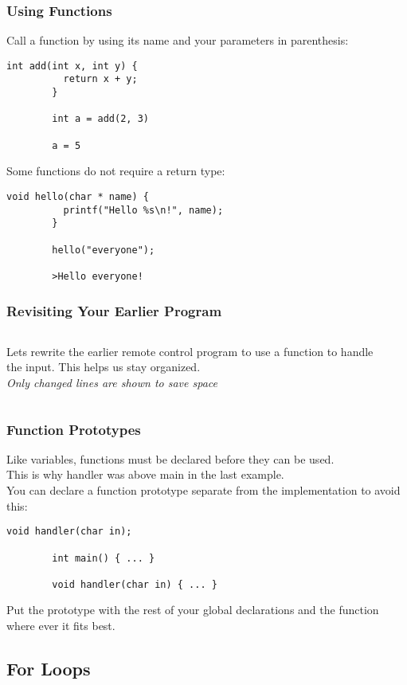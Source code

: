 \begin{frame}[fragile]
	\frametitle{Using Functions}
	Call a function by using its name and your parameters in parenthesis:
	\begin{lstlisting}[numbers=none]
		int add(int x, int y) {
		  return x + y;
		}
		
		int a = add(2, 3)
		
		a = 5
	\end{lstlisting}
	Some functions do not require a return type:
	\begin{lstlisting}[numbers=none]
		void hello(char * name) {
		  printf("Hello %s\n!", name);
		}
		
		hello("everyone");
		
		>Hello everyone!
	\end{lstlisting}
\end{frame}

\begin{frame}[fragile]
	\frametitle{Revisiting Your Earlier Program}
	\begin{columns}[T]
		\begin{column}{0.5\textwidth}
			Lets rewrite the earlier remote control program to use a function to handle the input.
			This helps us stay organized.\\
			\pause
			\vspace{2ex}
			\textit{Only changed lines are shown to save space}
		\end{column}
		\begin{column}{0.5\textwidth}
	
		\end{column}
	\end{columns}
\end{frame}

\begin{frame}[fragile]
	\frametitle{Function Prototypes}
	Like variables, functions must be declared before they can be used.\\
	This is why handler was above main in the last example.\\
	\vfill
	You can declare a function prototype separate from the implementation to avoid this:
	\begin{lstlisting}[numbers=none]
		void handler(char in);
		
		int main() { ... }
		
		void handler(char in) { ... }
	\end{lstlisting}
	Put the prototype with the rest of your global declarations and the function where ever it fits best.
\end{frame}

\subsection{For Loops}
\label{sub:for_loops}

